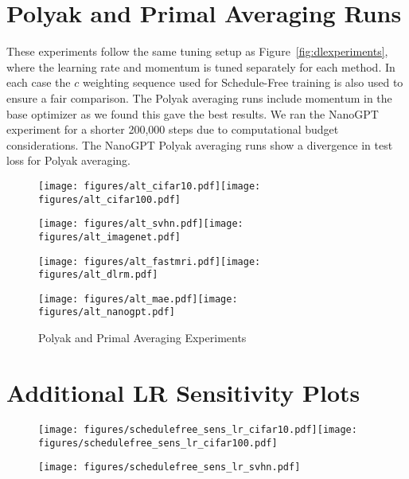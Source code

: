 \documentclass{article}
\begin{document}
\newpage
\section{Polyak and Primal Averaging Runs}
\label{app:averaging}These experiments follow the same tuning setup as Figure~\ref{fig:dlexperiments}, where the learning rate and momentum is tuned separately for each method. In each case the $c$ weighting sequence used for Schedule-Free training is also used to ensure a fair comparison. The Polyak averaging runs include momentum in the base optimizer as we found this gave the best results. We ran the NanoGPT experiment for a shorter 200,000 steps due to computational budget considerations. The NanoGPT Polyak averaging runs show a divergence in test loss for Polyak averaging.
\begin{figure}[h]
\newcommand{\figwidth}{0.5\textwidth}
\center\texttt{[image: figures/alt\_cifar10.pdf]}\texttt{[image: figures/alt\_cifar100.pdf]}

\texttt{[image: figures/alt\_svhn.pdf]}\texttt{[image: figures/alt\_imagenet.pdf]}

\texttt{[image: figures/alt\_fastmri.pdf]}\texttt{[image: figures/alt\_dlrm.pdf]}

\texttt{[image: figures/alt\_mae.pdf]}\texttt{[image: figures/alt\_nanogpt.pdf]}\caption{\label{fig:altexperiments}Polyak and Primal Averaging Experiments}
\end{figure}

\newpage
\section{Additional LR Sensitivity Plots}
\label{sec:lr_sens_appendix}
\begin{figure}[h]
\centering
\texttt{[image: figures/schedulefree\_sens\_lr\_cifar10.pdf]}\texttt{[image: figures/schedulefree\_sens\_lr\_cifar100.pdf]}

\texttt{[image: figures/schedulefree\_sens\_lr\_svhn.pdf]}\end{figure}
\end{document}
